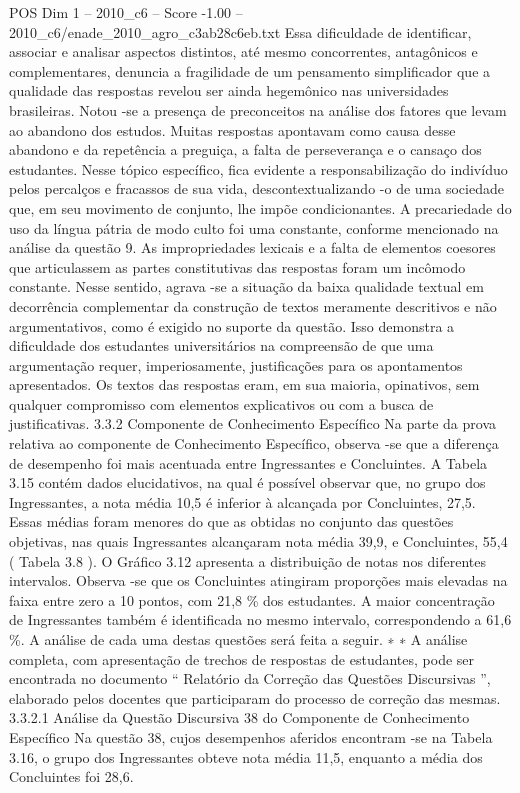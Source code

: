 \begin{textsample}{POS Dim 1 – 2010\_c6 – Score -1.00 – 2010\_c6/enade\_2010\_agro\_c3ab28c6eb.txt}
Essa dificuldade de identificar, associar e analisar aspectos distintos, até mesmo concorrentes, antagônicos e complementares, denuncia a fragilidade de um pensamento simplificador que a qualidade das respostas revelou ser ainda hegemônico nas universidades brasileiras.
Notou -se a presença de preconceitos na análise dos fatores que levam ao abandono dos estudos.
Muitas respostas apontavam como causa desse abandono e da repetência a preguiça, a falta de perseverança e o cansaço dos estudantes.
Nesse tópico específico, fica evidente a responsabilização do indivíduo pelos percalços e fracassos de sua vida, descontextualizando -o de uma sociedade que, em seu movimento de conjunto, lhe impõe condicionantes.
A precariedade do uso da língua pátria de modo culto foi uma constante, conforme mencionado na análise da questão 9.
As impropriedades lexicais e a falta de elementos coesores que articulassem as partes constitutivas das respostas foram um incômodo constante.
Nesse sentido, agrava -se a situação da baixa qualidade textual em decorrência complementar da construção de textos meramente descritivos e não argumentativos, como é exigido no suporte da questão.
Isso demonstra a dificuldade dos estudantes universitários na compreensão de que uma argumentação requer, imperiosamente, justificações para os apontamentos apresentados.
Os textos das respostas eram, em sua maioria, opinativos, sem qualquer compromisso com elementos explicativos ou com a busca de justificativas. 3.3.2 Componente de Conhecimento Específico Na parte da prova relativa ao componente de Conhecimento Específico, observa -se que a diferença de desempenho foi mais acentuada entre Ingressantes e Concluintes.
A Tabela 3.15 contém dados elucidativos, na qual é possível observar que, no grupo dos Ingressantes, a nota média 10,5 é inferior à alcançada por Concluintes, 27,5.
Essas médias foram menores do que as obtidas no conjunto das questões objetivas, nas quais Ingressantes alcançaram nota média 39,9, e Concluintes, 55,4 ( Tabela 3.8 ).
O Gráfico 3.12 apresenta a distribuição de notas nos diferentes intervalos.
Observa -se que os Concluintes atingiram proporções mais elevadas na faixa entre zero a 10 pontos, com 21,8 \% dos estudantes.
A maior concentração de Ingressantes também é identificada no mesmo intervalo, correspondendo a 61,6 \%.
A análise de cada uma destas questões será feita a seguir. ∗ ∗ A análise completa, com apresentação de trechos de respostas de estudantes, pode ser encontrada no documento “ Relatório da Correção das Questões Discursivas ”, elaborado pelos docentes que participaram do processo de correção das mesmas. 3.3.2.1 Análise da Questão Discursiva 38 do Componente de Conhecimento Específico Na questão 38, cujos desempenhos aferidos encontram -se na Tabela 3.16, o grupo dos Ingressantes obteve nota média 11,5, enquanto a média dos Concluintes foi 28,6.

\end{textsample}
